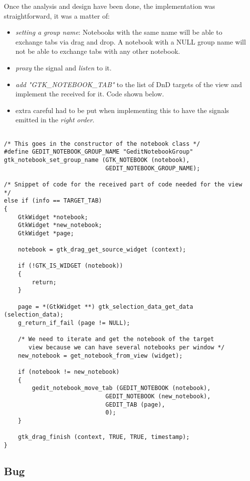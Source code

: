 Once the analysis and design have been done, the implementation was straightforward, it was a matter of:
\begin{itemize}
  \item \emph{setting a group name}: Notebooks with the same name will be able to exchange tabs via drag and drop. A notebook with a NULL group name will not be able to exchange tabs with any other notebook.
  \item \emph{proxy} the signal and \emph{listen} to it.
  \item \emph{add "GTK\_NOTEBOOK\_TAB"} to the list of DnD targets of the view and implement the received for it. Code shown below.
  \item extra careful had to be put when implementing this to have the signals emitted in the \emph{right order}.
\end{itemize}

\begin{lstlisting}[style=GObject]

/* This goes in the constructor of the notebook class */
#define GEDIT_NOTEBOOK_GROUP_NAME "GeditNotebookGroup"
gtk_notebook_set_group_name (GTK_NOTEBOOK (notebook),
                             GEDIT_NOTEBOOK_GROUP_NAME);

/* Snippet of code for the received part of code needed for the view */
else if (info == TARGET_TAB)
{
	GtkWidget *notebook;
	GtkWidget *new_notebook;
	GtkWidget *page;

	notebook = gtk_drag_get_source_widget (context);

	if (!GTK_IS_WIDGET (notebook))
	{
		return;
	}

	page = *(GtkWidget **) gtk_selection_data_get_data (selection_data);
	g_return_if_fail (page != NULL);

	/* We need to iterate and get the notebook of the target
	   view because we can have several notebooks per window */
	new_notebook = get_notebook_from_view (widget);

	if (notebook != new_notebook)
	{
		gedit_notebook_move_tab (GEDIT_NOTEBOOK (notebook),
			                 GEDIT_NOTEBOOK (new_notebook),
			                 GEDIT_TAB (page),
			                 0);
	}

	gtk_drag_finish (context, TRUE, TRUE, timestamp);
}

\end{lstlisting}

\subsection{Bug}

